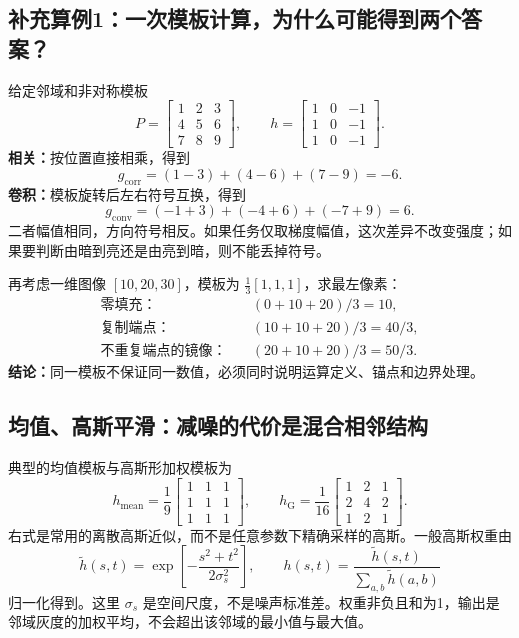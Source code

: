 \subsection{补充算例1：一次模板计算，为什么可能得到两个答案？}
给定邻域和非对称模板
\[
P=\begin{bmatrix}1&2&3\\4&5&6\\7&8&9\end{bmatrix},\qquad
h=\begin{bmatrix}1&0&-1\\1&0&-1\\1&0&-1\end{bmatrix}.
\]
\textbf{相关：}按位置直接相乘，得到
\[
g_{\mathrm{corr}}=(1-3)+(4-6)+(7-9)=-6.
\]
\textbf{卷积：}模板旋转后左右符号互换，得到
\[
g_{\mathrm{conv}}=(-1+3)+(-4+6)+(-7+9)=6.
\]
二者幅值相同，方向符号相反。如果任务仅取梯度幅值，这次差异不改变强度；如果要判断由暗到亮还是由亮到暗，则不能丢掉符号。

再考虑一维图像 $[10,20,30]$，模板为 $\frac13[1,1,1]$，求最左像素：
\[
\begin{aligned}
\text{零填充：}&\quad (0+10+20)/3=10,\\
\text{复制端点：}&\quad (10+10+20)/3=40/3,\\
\text{不重复端点的镜像：}&\quad (20+10+20)/3=50/3.
\end{aligned}
\]
\textbf{结论：}同一模板不保证同一数值，必须同时说明运算定义、锚点和边界处理。

\subsection{均值、高斯平滑：减噪的代价是混合相邻结构}
典型的均值模板与高斯形加权模板为
\[
h_{\mathrm{mean}}=\frac19\begin{bmatrix}1&1&1\\1&1&1\\1&1&1\end{bmatrix},\qquad
h_{\mathrm{G}}=\frac1{16}\begin{bmatrix}1&2&1\\2&4&2\\1&2&1\end{bmatrix}.
\]
右式是常用的离散高斯近似，而不是任意参数下精确采样的高斯。一般高斯权重由
\[
\widetilde h(s,t)=\exp\left[-\frac{s^2+t^2}{2\sigma_s^2}\right],\qquad
h(s,t)=\frac{\widetilde h(s,t)}{\sum_{a,b}\widetilde h(a,b)}
\]
归一化得到。这里 $\sigma_s$ 是空间尺度，不是噪声标准差。权重非负且和为1，输出是邻域灰度的加权平均，不会超出该邻域的最小值与最大值。

